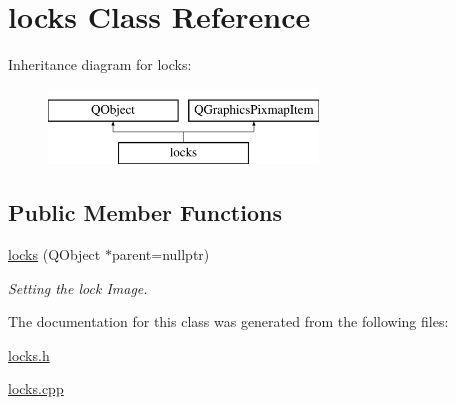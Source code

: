 \hypertarget{classlocks}{\section{locks Class Reference}
\label{classlocks}
}
Inheritance diagram for locks\-:\begin{figure}[H]
\begin{center}
\leavevmode
\includegraphics[height=2.000000cm]{classlocks}
\end{center}
\end{figure}
\subsection*{Public Member Functions}
\begin{DoxyCompactItemize}
\item 
\hypertarget{classlocks_a66bc229b3a60f6baa5d3f34f218a5114}{\hyperlink{classlocks_a66bc229b3a60f6baa5d3f34f218a5114}{locks} (Q\-Object $\ast$parent=nullptr)}\label{classlocks_a66bc229b3a60f6baa5d3f34f218a5114}

\begin{DoxyCompactList}\small\item\em Setting the lock Image. \end{DoxyCompactList}\end{DoxyCompactItemize}


The documentation for this class was generated from the following files\-:\begin{DoxyCompactItemize}
\item 
\hyperlink{locks_8h}{locks.\-h}\item 
\hyperlink{locks_8cpp}{locks.\-cpp}\end{DoxyCompactItemize}
